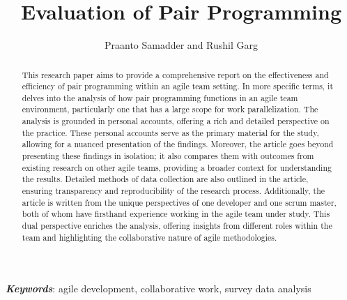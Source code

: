 \documentclass{article}
\title{Evaluation of Pair Programming}
\author{ Praanto Samadder and Rushil Garg }
\begin{document}
\maketitle
\begin{abstract}
    This research paper aims to provide a comprehensive report on the effectiveness and efficiency of pair programming within an agile team setting. In more specific terms, it delves into the analysis of how pair programming functions in an agile team environment, particularly one that has a large scope for work parallelization. The analysis is grounded in personal accounts, offering a rich and detailed perspective on the practice. These personal accounts serve as the primary material for the study, allowing for a nuanced presentation of the findings. Moreover, the article goes beyond presenting these findings in isolation; it also compares them with outcomes from existing research on other agile teams, providing a broader context for understanding the results. Detailed methods of data collection are also outlined in the article, ensuring transparency and reproducibility of the research process. Additionally, the article is written from the unique perspectives of one developer and one scrum master, both of whom have firsthand experience working in the agile team under study. This dual perspective enriches the analysis, offering insights from different roles within the team and highlighting the collaborative nature of agile methodologies.
\end{abstract}

\textbf{\textit{Keywords}}: agile development, collaborative work, survey data analysis







\end{document}
